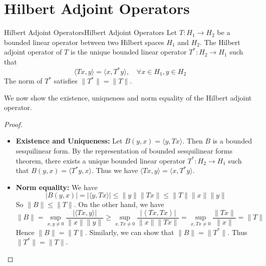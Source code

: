 \documentclass[../main.tex]{subfiles}
\begin{document}
\section{Hilbert Adjoint Operators}

\begin{definition}{Hilbert Adjoint Operators}{Hilbert Adjoint Operators}
	Let $T: H_1 \rightarrow H_2$ be a bounded linear operator between two Hilbert spaces $H_1$ and $H_2$. The Hilbert adjoint operator of $T$ is the unique bounded linear operator $T^*: H_2 \rightarrow H_1$ such that
	\begin{equation}
		\langle Tx, y \rangle = \langle x, T^* y \rangle, \quad \forall x\in H_1, y\in H_2
	\end{equation}
	The norm of $T^*$ satisfies $\|T^*\| = \|T\|$.
\end{definition}

We now show the existence, uniqueness and norm equality of the Hilbert adjoint operator.
\begin{proof}
\begin{itemize}
	\item \textbf{Existence and Uniqueness:} Let $B(y,x) = \langle y, Tx \rangle$. Then $B$ is a bounded sesquilinear form. By the representation of bounded sesquilinear forms theorem, there exists a unique bounded linear operator $T^*: H_2 \to H_1$ such that $B(y,x) = \langle T^*y,  x \rangle$. Thus we have $\langle Tx, y \rangle = \langle x, T^* y \rangle$.
	\item \textbf{Norm equality:} We have
		\begin{equation*}
			|B(y,x)| = |\langle y, Tx \rangle| \leq \|y\| \|Tx\| \leq \|T\| \|x\| \|y\|
		\end{equation*}
		So $\|B\| \leq \|T\|$. On the other hand, we have
		\begin{equation*}
			\|B\| = \sup_{x,y\neq 0} \frac{|\langle Tx, y \rangle|}{\|x\| \|y\|} \geq \sup_{x,Tx\neq 0} \frac{|\left<Tx,Tx\right>|}{\|x\| \|Tx\|} = \sup_{x,Tx\neq 0} \frac{\|Tx\|}{\|x\|} = \|T\|
		\end{equation*}
		Hence $\|B\| = \|T\|$. Similarly, we can show that $\|B\| = \|T^*\|$. Thus $\|T^*\| = \|T\|$.
\end{itemize}
\end{proof}
\end{document}
